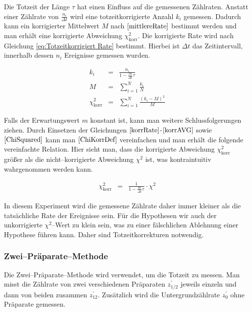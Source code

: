 \documentclass[12pt,a4paper]{scrartcl}
\numberwithin{equation}{section} %
\begin{document}
Die Totzeit der Länge $\tau$ hat einen Einfluss auf die gemessenen Zählraten. Anstatt einer Zählrate von $\frac{n_i}{\Delta t}$ wird eine totzeitkorrigierte Anzahl $k_i$ gemessen. Dadurch kann ein korrigierter Mittelwert $M$ nach $\eqref{mittlereRate}$ bestimmt werden und man erhält eine korrigierte Abweichung $\chi^2_\mathrm{korr}$. Die korrigierte Rate wird nach Gleichung \eqref{eq:Totzeitkorrigiert Rate} bestimmt. Hierbei ist $\Delta t$ das Zeitintervall, innerhalb dessen $n_i$ Ereignisse gemessen wurden.

\begin{eqnarray}
    k_i &=&
        \frac{
            n_i
        }{
            1 - \frac{m}{\Delta t}\tau
        } \label{korrRate} \\
    M &=& \sum_{i=1}^N \frac{k_i}{N} \label{korrAVG} \\
    \chi^2_\mathrm{korr} &=& \sum_{i=1}^N
        \frac{(k_i - M)^2}{M} \label{ChiKorrDef}
\end{eqnarray}

\noindent
Falls der Erwartungswert $m$ konstant ist, kann man weitere Schlussfolgerungen ziehen. Durch Einsetzen der Gleichungen $\eqref{korrRate}$-$\eqref{korrAVG}$ sowie $\eqref{ChiSquared}$ kann man $\eqref{ChiKorrDef}$ vereinfachen und man erhält die folgende vereinfachte Relation. Hier sieht man, dass die korrigierte Abweichung $\chi^2_\mathrm{korr}$ größer als die nicht--korrigierte Abweichung $\chi^2$ ist, was kontraintuitiv wahrgenommen werden kann.

\begin{eqnarray}
    \chi^2_\mathrm{korr} &=&
        \frac{1}{1 - \frac{m}{\Delta t}\tau} \cdot \chi^2 \label{eq:Chi^2 korr}
\end{eqnarray}

\noindent
In diesem Experiment wird die gemessene Zählrate daher immer kleiner als die tatsächliche Rate der Ereignisse sein. Für die Hypothesen wir auch der unkorrigierte $\chi^2$--Wert zu klein sein, was zu einer fälschlichen Ablehnung einer Hypothese führen kann. Daher sind Totzeitkorrekturen notwendig.

\subsubsection{Zwei--Präparate--Methode}
Die Zwei--Präparate--Methode wird verwendet, um die Totzeit zu messen. Man misst die Zählrate von zwei verschiedenen Präparaten $z^\prime_{1/2}$ jeweils einzeln und dann von beiden zusammen $z^\prime_{12}$. Zusätzlich wird die Untergrundzählrate $z^\prime_0$ ohne Präparate gemessen.
\end{document}
